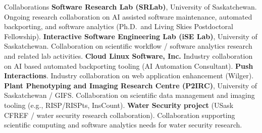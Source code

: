 \begin{rubric}{Collaborations}
\entry*[SRLab]%
	\textbf{Software Research Lab (SRLab)}, University of Saskatchewan. Ongoing research collaboration on AI assisted software maintenance, automated backporting, and software analytics (Ph.D.\ and Living Skies Postdoctoral Fellowship).
\vspace{-1mm}
\entry*[iSE]%
	\textbf{Interactive Software Engineering Lab (iSE Lab)}, University of Saskatchewan. Collaboration on scientific workflow / software analytics research and related lab activities.
\vspace{-1mm}
\entry*[Industry]%
	\textbf{Cloud Linux Software, Inc.} Industry collaboration on AI based automated backporting tooling (AI Automation Consultant).
	\textbf{Push Interactions}. Industry collaboration on web application enhancement (Wilger).
\vspace{-1mm}
\entry*[P2IRC]%
	\textbf{Plant Phenotyping and Imaging Research Centre ({P2IRC})}, University of Saskatchewan / GIFS. Collaboration on scientific data management and imaging tooling (e.g., {RISP}/{RISPts}, {InsCount}).
\vspace{-1mm}
\entry*[Water]%
	\textbf{Water Security project} (USask CFREF / water security research collaboration). Collaboration supporting scientific computing and software analytics needs for water security research.
\end{rubric}
